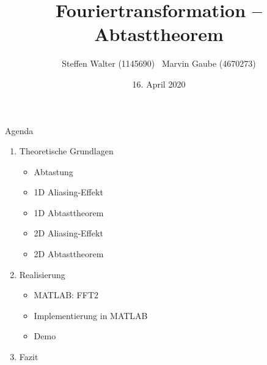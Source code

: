 \documentclass{beamer}
\title{Fouriertransformation -- Abtasttheorem}
\author{Steffen Walter (1145690) \ Marvin Gaube (4670273)}
\institute{Duale Hochschule Baden-Württemberg -- Stuttgart\newline Vorlesung: Digitale Bildverarbeitung}
\date{16. April 2020}
\begin{document}
	\maketitle
	\begin{frame}{Agenda}
		\begin{enumerate}
			\item Theoretische Grundlagen
			\begin{itemize}
				\item Abtastung
				\item 1D Aliasing-Effekt
				\item 1D Abtasttheorem
				\item 2D Aliasing-Effekt
				\item 2D Abtasttheorem
			\end{itemize}
			\item Realisierung
			\begin{itemize}
				\item MATLAB: FFT2
				\item Implementierung in MATLAB
				\item Demo
			\end{itemize}
			\item Fazit
		\end{enumerate}
	\end{frame}
\end{document}
